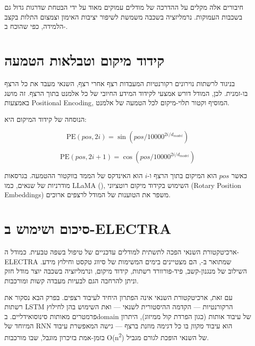 חיבורים אלה מקלים על ההדרכה של מודלים עמוקים מאוד על ידי הבטחת שדרגות גדול גם בשכבות העמוקות. נרמליזציה בשכבה משמשת לשיפור יציבות האימון וצמצום התלות בקצב הלמידה, כפי שהוכח ב-\cite{radford2019language}.

\section{קידוד מיקום וטבלאות הטמעה}

בניגוד לרשתות נוירונים רקורנטיות המעבדות רצף אחרי רצף, השנאי מעבד את כל הרצף בו-זמנית. לכן, המודל דורש אמצעי לקידוד המידע החיובי של כל אלמנט בתוך הרצף. זה מושג באמצעות \textenglish{Positional Encoding}, המוסיף וקטור תלוי-מיקום לכל הטמעה של אלמנט.

הנוסחה של קידוד המיקום היא:

\begin{equation}
\text{PE}(pos, 2i) = \sin(pos / 10000^{2i/d_{model}})
\end{equation}

\begin{equation}
\text{PE}(pos, 2i+1) = \cos(pos / 10000^{2i/d_{model}})
\end{equation}

כאשר \(pos\) הוא המיקום בתוך הרצף ו-\(i\) הוא האינדקס של הממד בווקטור ההטמעה. בגרסאות מודרניות של שנאים, כמו \textenglish{LLaMA} (\cite{touvron2023llama}), השימוש בקידוד מיקום רוטציוני (\textenglish{Rotary Position Embeddings}) משפר את הטוענות של המודל לרצפים ארוכים.

\section{סיכום ושימוש ב-\textenglish{ELECTRA}}

ארכיטקטורת השנאי הפכה לתשתית למודלים עדכניים של טיפול בשפה טבעית. כמודל ה-\textenglish{ELECTRA} שמתואר ב-\cite{clark2020electra}, הם מצטיינים בימים המשימות של סיווג טקסט וחילוץ מידע. השילוב של מנגנון-קשב, פיד-פורוורד רשתות, קידוד מיקום, ונרמליזציה בשכבה יוצר מודל חזק וניתן להרחבה הגם לבעיות מעבדה קשות ומורכבות.

עם זאת, ארכיטקטורת השנאי אינה הפתרון היחיד לעיבוד רצפים. בפרק הבא נסקור את רשתות \textenglish{LSTM} הרקורנטיות --- הקדמה ההיסטורית לשנאי --- ואת השימוש בהן לחילוץ פרמטרים מאותות סינוסואידליים. ב\-\textenglish{domain} של עיבוד אותות (כגון הפרדת קול ממיזוג), היתרון המיוחד של \textenglish{RNN} הוא עיבוד \emph{מקוון} בו כל דגימה מוזנת ברצף --- גישה המאפשרת עיבוד בזמן-אמת בזיכרון מוגבל, שבו מורכבות \textenglish{O(n\textsuperscript{2})} של השנאי הופכת לגורם מגביל.
